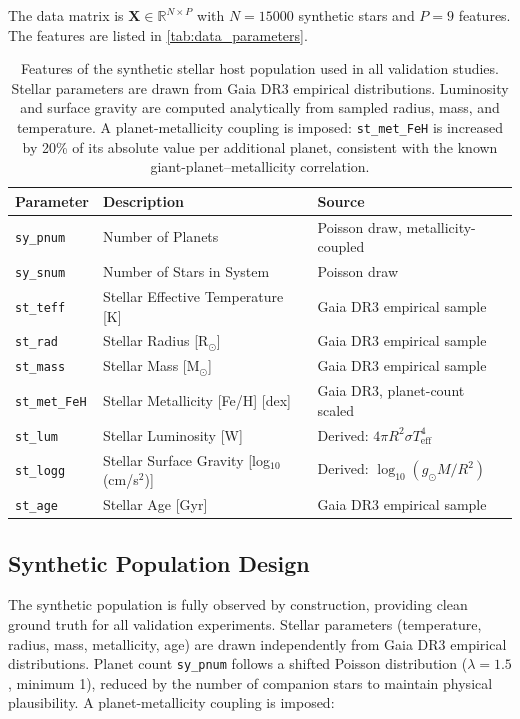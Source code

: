 \documentclass[preprint]{aastex631}
\begin{document}
The data matrix is $\mathbf{X} \in \mathbb{R}^{N \times P}$ with $N = 15000$ synthetic stars and $P = 9$ features. The features are listed in \autoref{tab:data_parameters}.

\begin{table}
  \centering
  \begin{tabular}{lll}
    \hline
    \textbf{Parameter} & \textbf{Description} & \textbf{Source} \\
    \hline
    \verb|sy_pnum| & Number of Planets & Poisson draw, metallicity-coupled \\
    \verb|sy_snum| & Number of Stars in System & Poisson draw \\
    \verb|st_teff| & Stellar Effective Temperature [K] & Gaia DR3 empirical sample \\
    \verb|st_rad|  & Stellar Radius [R$_\odot$] & Gaia DR3 empirical sample \\
    \verb|st_mass| & Stellar Mass [M$_\odot$] & Gaia DR3 empirical sample \\
    \verb|st_met_FeH| & Stellar Metallicity [Fe/H] [dex] & Gaia DR3, planet-count scaled \\
    \verb|st_lum|  & Stellar Luminosity [W] & Derived: $4\pi R^2 \sigma T_{\text{eff}}^4$ \\
    \verb|st_logg| & Stellar Surface Gravity [log$_{10}$(cm/s$^2$)] & Derived: $\log_{10}(g_\odot M/R^2)$ \\
    \verb|st_age|  & Stellar Age [Gyr] & Gaia DR3 empirical sample \\
    \hline
  \end{tabular}
  \caption{Features of the synthetic stellar host population used in all validation studies. Stellar parameters are drawn from Gaia DR3 empirical distributions. Luminosity and surface gravity are computed analytically from sampled radius, mass, and temperature. A planet-metallicity coupling is imposed: \texttt{st\_met\_FeH} is increased by 20\% of its absolute value per additional planet, consistent with the known giant-planet--metallicity correlation.}
  \label{tab:data_parameters}
\end{table}

\subsection{Synthetic Population Design}

The synthetic population is fully observed by construction, providing clean ground truth for all validation experiments. Stellar parameters (temperature, radius, mass, metallicity, age) are drawn independently from Gaia DR3 empirical distributions. Planet count \texttt{sy\_pnum} follows a shifted Poisson distribution ($\lambda = 1.5$, minimum 1), reduced by the number of companion stars to maintain physical plausibility. A planet-metallicity coupling is imposed:
\end{document}
